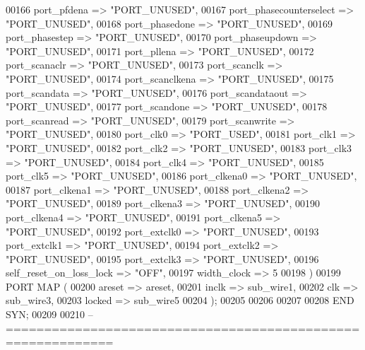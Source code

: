 \begin{DoxyCode}
{00166         port\_pfdena => \textcolor{keyword}{"PORT\_UNUSED"},
00167         port\_phasecounterselect => \textcolor{keyword}{"PORT\_UNUSED"},
00168         port\_phasedone => \textcolor{keyword}{"PORT\_UNUSED"},
00169         port\_phasestep => \textcolor{keyword}{"PORT\_UNUSED"},
00170         port\_phaseupdown => \textcolor{keyword}{"PORT\_UNUSED"},
00171         port\_pllena => \textcolor{keyword}{"PORT\_UNUSED"},
00172         port\_scanaclr => \textcolor{keyword}{"PORT\_UNUSED"},
00173         port\_scanclk => \textcolor{keyword}{"PORT\_UNUSED"},
00174         port\_scanclkena => \textcolor{keyword}{"PORT\_UNUSED"},
00175         port\_scandata => \textcolor{keyword}{"PORT\_UNUSED"},
00176         port\_scandataout => \textcolor{keyword}{"PORT\_UNUSED"},
00177         port\_scandone => \textcolor{keyword}{"PORT\_UNUSED"},
00178         port\_scanread => \textcolor{keyword}{"PORT\_UNUSED"},
00179         port\_scanwrite => \textcolor{keyword}{"PORT\_UNUSED"},
00180         port\_clk0 => \textcolor{keyword}{"PORT\_USED"},
00181         port\_clk1 => \textcolor{keyword}{"PORT\_UNUSED"},
00182         port\_clk2 => \textcolor{keyword}{"PORT\_UNUSED"},
00183         port\_clk3 => \textcolor{keyword}{"PORT\_UNUSED"},
00184         port\_clk4 => \textcolor{keyword}{"PORT\_UNUSED"},
00185         port\_clk5 => \textcolor{keyword}{"PORT\_UNUSED"},
00186         port\_clkena0 => \textcolor{keyword}{"PORT\_UNUSED"},
00187         port\_clkena1 => \textcolor{keyword}{"PORT\_UNUSED"},
00188         port\_clkena2 => \textcolor{keyword}{"PORT\_UNUSED"},
00189         port\_clkena3 => \textcolor{keyword}{"PORT\_UNUSED"},
00190         port\_clkena4 => \textcolor{keyword}{"PORT\_UNUSED"},
00191         port\_clkena5 => \textcolor{keyword}{"PORT\_UNUSED"},
00192         port\_extclk0 => \textcolor{keyword}{"PORT\_UNUSED"},
00193         port\_extclk1 => \textcolor{keyword}{"PORT\_UNUSED"},
00194         port\_extclk2 => \textcolor{keyword}{"PORT\_UNUSED"},
00195         port\_extclk3 => \textcolor{keyword}{"PORT\_UNUSED"},
00196         self\_reset\_on\_loss\_lock => \textcolor{keyword}{"OFF"},
00197         width\_clock => \textcolor{vhdllogic}{5}
00198     \textcolor{vhdlchar}{)}
00199     \textcolor{keywordflow}{PORT} \textcolor{keywordflow}{MAP} (
00200         areset => areset,
00201         inclk => sub_wire1,
00202         clk => sub_wire3,
00203         locked => sub_wire5
00204     \textcolor{vhdlchar}{)};
00205 
00206 
00207 
00208 \textcolor{keywordflow}{END} \textcolor{vhdlchar}{SYN};
00209 
00210 \textcolor{keyword}{-- ============================================================}
}
\end{DoxyCode}
